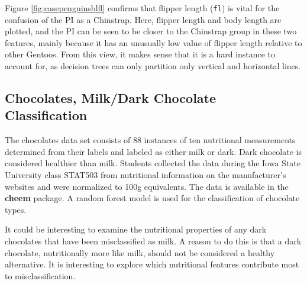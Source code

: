 \documentclass[11pt,twoside]{article}
\begin{document}
Figure \ref{fig:casepenguinsblfl} confirms that flipper length (\texttt{fl}) is vital for the confusion of the PI as a Chinstrap. Here, flipper length and body length are plotted, and the PI can be seen to be closer to the Chinstrap group in these two features, mainly because it has an unusually low value of flipper length relative to other Gentoos. From this view, it makes sense that it is a hard instance to account for, as decision trees can only partition only vertical and horizontal lines.

\hypertarget{chocolates-milkdark-chocolate-classification}{%
\subsection{Chocolates, Milk/Dark Chocolate Classification}\label{chocolates-milkdark-chocolate-classification}}

The chocolates data set consists of 88 instances of ten nutritional measurements determined from their labels and labeled as either milk or dark. Dark chocolate is considered healthier than milk. Students collected the data during the Iowa State University class STAT503 from nutritional information on the manufacturer's websites and were normalized to 100g equivalents. The data is available in the \textbf{cheem} package. A random forest model is used for the classification of chocolate types.

It could be interesting to examine the nutritional properties of any dark chocolates that have been misclassified as milk. A reason to do this is that a dark chocolate, nutritionally more like milk, should not be considered a healthy alternative. It is interesting to explore which nutritional features contribute most to misclassification.
\end{document}

